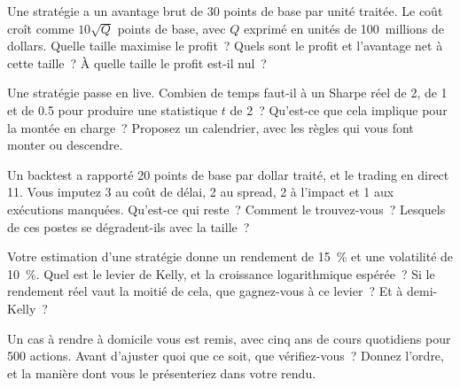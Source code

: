\begin{question}\label{iq:iv2:research-and-strategy-cases:16}
Une stratégie a un avantage brut de 30 points de base par unité traitée. Le coût croît comme $10\sqrt{Q}$ points de base, avec $Q$ exprimé en unités de 100~millions de dollars. Quelle taille maximise le profit~? Quels sont le profit et l'avantage net à cette taille~? À quelle taille le profit est-il nul~?
\end{question}

\begin{question}\label{iq:iv2:research-and-strategy-cases:17}
Une stratégie passe en live. Combien de temps faut-il à un Sharpe réel de 2, de 1 et de 0.5 pour produire une statistique $t$ de 2~? Qu'est-ce que cela implique pour la montée en charge~? Proposez un calendrier, avec les règles qui vous font monter ou descendre.
\end{question}

\begin{question}\label{iq:iv2:research-and-strategy-cases:18}
Un backtest a rapporté 20 points de base par dollar traité, et le trading en direct 11. Vous imputez 3 au coût de délai, 2 au spread, 2 à l'impact et 1 aux exécutions manquées. Qu'est-ce qui reste~? Comment le trouvez-vous~? Lesquels de ces postes se dégradent-ils avec la taille~?
\end{question}

\begin{question}\label{iq:iv2:research-and-strategy-cases:19}
Votre estimation d'une stratégie donne un rendement de 15~\% et une volatilité de 10~\%. Quel est le levier de Kelly, et la croissance logarithmique espérée~? Si le rendement réel vaut la moitié de cela, que gagnez-vous à ce levier~? Et à demi-Kelly~?
\end{question}

\begin{question}\label{iq:iv2:research-and-strategy-cases:20}
Un cas à rendre à domicile vous est remis, avec cinq ans de cours quotidiens pour 500 actions. Avant d'ajuster quoi que ce soit, que vérifiez-vous~? Donnez l'ordre, et la manière dont vous le présenteriez dans votre rendu.
\end{question}

